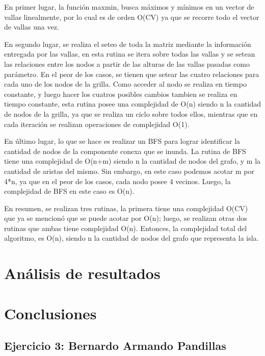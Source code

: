 \documentclass[a4paper, 12pt]{article}
\begin{document}
 
En primer lugar, la funci\'on maxmin, busca m\'aximos y m\'inimos en un vector de vallas linealmente, por lo cual es de orden O(CV) ya que se recorre todo el vector de vallas una vez.

En segundo lugar, se realiza el seteo de toda la matriz mediante la informaci\'on entregada por las vallas, en esta rutina se itera sobre todas las vallas y se setean las relaciones entre los nodos a partir de las alturas de las vallas pasadas como par\'ametro. En el peor de los casos, se tienen que setear las cuatro relaciones para cada uno de los nodos de la grilla. Como acceder al nodo se realiza en tiempo constante, y luego hacer los cuatros posibles cambios tambien se realiza en tiempo constante, esta rutina posee una complejidad de O(n) siendo n la cantidad de nodos de la grilla, ya que se realiza un ciclo sobre todos ellos, mientras que en cada iteraci\'on se realizan operaciones de complejidad O(1).

En \'ultimo lugar, lo que se hace es realizar un BFS para lograr identificar la cantidad de nodos de la componente conexa que se inunda. La rutina de BFS tiene una complejidad de O(n+m) siendo n la cantidad de nodos del grafo, y m la cantidad de aristas del mismo. Sin embargo, en este caso podemos acotar m por 4*n, ya que en el peor de los casos, cada nodo posee 4 vecinos. Luego, la complejidad de BFS en este caso es O(n).

En resumen, se realizan tres rutinas, la primera tiene una complejidad O(CV) que ya se mencion\'o que se puede acotar por O(n); luego, se realizan otras dos rutinas que ambas tiene complejidad O(n). Entonces, la complejidad total del algoritmo, es O(n), siendo n la cantidad de nodos del grafo que representa la isla.

\section*{An\'alisis de resultados}
\section*{Conclusiones}

\begin{center}
\item \section*{Ejercicio 3: Bernardo Armando Pandillas}
\end{center}
\end{document}
